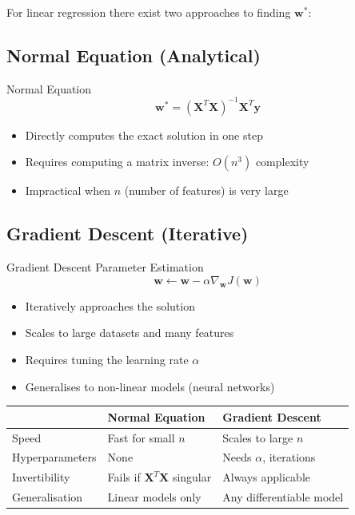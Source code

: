 \documentclass[12pt,a4paper]{report}
\begin{document}
For linear regression there exist two approaches to finding $\mathbf{w}^*$:

\subsection{Normal Equation (Analytical)}

\begin{formulabox}{Normal Equation}
\[
\mathbf{w}^* = (\mathbf{X}^T \mathbf{X})^{-1} \mathbf{X}^T \mathbf{y}
\]
\begin{itemize}[noitemsep]
  \item Directly computes the exact solution in one step
  \item Requires computing a matrix inverse: $O(n^3)$ complexity
  \item Impractical when $n$ (number of features) is very large
\end{itemize}
\end{formulabox}

\subsection{Gradient Descent (Iterative)}

\begin{formulabox}{Gradient Descent Parameter Estimation}
\[
\mathbf{w} \leftarrow \mathbf{w} - \alpha \nabla_{\mathbf{w}} J(\mathbf{w})
\]
\begin{itemize}[noitemsep]
  \item Iteratively approaches the solution
  \item Scales to large datasets and many features
  \item Requires tuning the learning rate $\alpha$
  \item Generalises to non-linear models (neural networks)
\end{itemize}
\end{formulabox}

\begin{center}
\begin{tabular}{lll}
\toprule
 & \textbf{Normal Equation} & \textbf{Gradient Descent} \\
\midrule
Speed & Fast for small $n$ & Scales to large $n$ \\
Hyperparameters & None & Needs $\alpha$, iterations \\
Invertibility & Fails if $\mathbf{X}^T\mathbf{X}$ singular & Always applicable \\
Generalisation & Linear models only & Any differentiable model \\
\bottomrule
\end{tabular}
\end{center}
\end{document}
